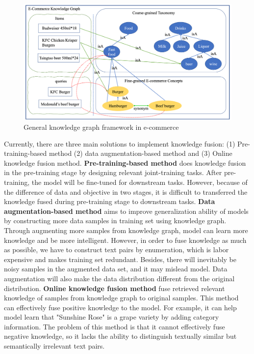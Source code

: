 \documentclass{article}
\begin{document}
\begin{figure}[h]
    \centering
    \includegraphics[scale=0.4]{mtkg.png}
    \caption{General knowledge graph framework in e-commerce}
    \label{fig2}
\end{figure}

Currently, there are three main solutions to implement knowledge fusion: (1) Pre-training-based method (2) data augmentation-based method and (3) Online knowledge fusion method. \textbf{Pre-training-based method} does knowledge fusion in the pre-training stage by designing relevant joint-training tasks. After pre-training, the model will be fine-tuned for downstream tasks. However, because of the difference of data and objective in two stages, it is difficult to transferred the knowledge fused during pre-training stage to downstream tasks. \textbf{Data augmentation-based method} aims to improve generalization ability of models by constructing more data samples in training set using knowledge graph. Through augmenting more samples from knowledge graph, model can learn more knowledge and be more intelligent. However, in order to fuse knowledge as much as possible, we have to construct text pairs by enumeration, which is labor expensive and makes training set redundant. Besides, there will inevitably be noisy samples in the augmented data set, and it may mislead model. Data augmentation will also make the data distribution different from the original distribution. \textbf{Online knowledge fusion method} fuse retrieved relevant knowledge of samples from knowledge graph to original samples. This method can effectively fuse positive knowledge to the model. For example, it can help model learn that "Sunshine Rose" is a grape variety by adding category information. The problem of this method is that it cannot effectively fuse negative knowledge, so it lacks the ability to distinguish textually similar but semantically irrelevant text pairs. 
\end{document}
